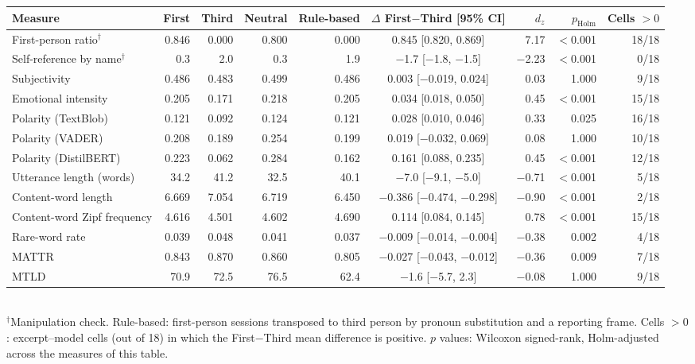 \begin{tabular}{lrrrrcrrr}
\toprule
Measure & First & Third & Neutral & Rule-based & $\Delta$ First$-$Third [95\% CI] & $d_z$ & $p_{\mathrm{Holm}}$ & Cells $>0$ \\
\midrule
First-person ratio$^\dagger$ & 0.846 & 0.000 & 0.800 & 0.000 & 0.845 [0.820, 0.869] & 7.17 & $<$0.001 & 18/18 \\
Self-reference by name$^\dagger$ & 0.3 & 2.0 & 0.3 & 1.9 & $-$1.7 [$-$1.8, $-$1.5] & $-$2.23 & $<$0.001 & 0/18 \\
Subjectivity & 0.486 & 0.483 & 0.499 & 0.486 & 0.003 [$-$0.019, 0.024] & 0.03 & 1.000 & 9/18 \\
Emotional intensity & 0.205 & 0.171 & 0.218 & 0.205 & 0.034 [0.018, 0.050] & 0.45 & $<$0.001 & 15/18 \\
Polarity (TextBlob) & 0.121 & 0.092 & 0.124 & 0.121 & 0.028 [0.010, 0.046] & 0.33 & 0.025 & 16/18 \\
Polarity (VADER) & 0.208 & 0.189 & 0.254 & 0.199 & 0.019 [$-$0.032, 0.069] & 0.08 & 1.000 & 10/18 \\
Polarity (DistilBERT) & 0.223 & 0.062 & 0.284 & 0.162 & 0.161 [0.088, 0.235] & 0.45 & $<$0.001 & 12/18 \\
Utterance length (words) & 34.2 & 41.2 & 32.5 & 40.1 & $-$7.0 [$-$9.1, $-$5.0] & $-$0.71 & $<$0.001 & 5/18 \\
Content-word length & 6.669 & 7.054 & 6.719 & 6.450 & $-$0.386 [$-$0.474, $-$0.298] & $-$0.90 & $<$0.001 & 2/18 \\
Content-word Zipf frequency & 4.616 & 4.501 & 4.602 & 4.690 & 0.114 [0.084, 0.145] & 0.78 & $<$0.001 & 15/18 \\
Rare-word rate & 0.039 & 0.048 & 0.041 & 0.037 & $-$0.009 [$-$0.014, $-$0.004] & $-$0.38 & 0.002 & 4/18 \\
MATTR & 0.843 & 0.870 & 0.860 & 0.805 & $-$0.027 [$-$0.043, $-$0.012] & $-$0.36 & 0.009 & 7/18 \\
MTLD & 70.9 & 72.5 & 76.5 & 62.4 & $-$1.6 [$-$5.7, 2.3] & $-$0.08 & 1.000 & 9/18 \\
\bottomrule
\end{tabular}
\\[2pt]
{\footnotesize $^\dagger$Manipulation check. Rule-based: first-person sessions transposed to third person by pronoun substitution and a reporting frame. Cells $>0$: excerpt--model cells (out of 18) in which the First$-$Third mean difference is positive. $p$ values: Wilcoxon signed-rank, Holm-adjusted across the measures of this table.}
